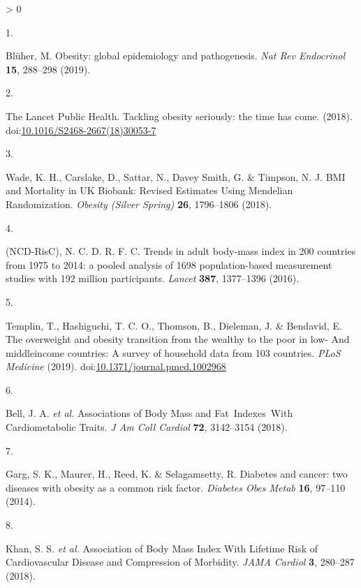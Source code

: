 \documentclass[11pt,twoside]{bristolthesis}
\newlength{\cslhangindent}
\newlength{\csllabelwidth}
\newenvironment{CSLReferences}[2] %
 {%
  \setlength{\parindent}{0pt}
  \ifodd #1 \everypar{\setlength{\hangindent}{\cslhangindent}}\ignorespaces\fi
  \ifnum #2 > 0
  \setlength{\parskip}{#2\baselineskip}
  \fi
 }%
 {}
\newcommand{\CSLLeftMargin}[1]{\parbox[t]{\csllabelwidth}{#1}}
\newcommand{\CSLRightInline}[1]{\parbox[t]{\linewidth - \csllabelwidth}{#1}\break}
\begin{document}
\hypertarget{refs}{}
\begin{CSLReferences}{0}{0}
\leavevmode\hypertarget{ref-Bluher2019}{}%
\CSLLeftMargin{1. }
\CSLRightInline{Blüher, M. {Obesity: global epidemiology and pathogenesis}. \emph{Nat Rev Endocrinol} \textbf{15}, 288--298 (2019).}

\leavevmode\hypertarget{ref-TheLancetPublicHealth2018}{}%
\CSLLeftMargin{2. }
\CSLRightInline{The Lancet Public Health. {Tackling obesity seriously: the time has come}. (2018). doi:\href{https://doi.org/10.1016/S2468-2667(18)30053-7}{10.1016/S2468-2667(18)30053-7}}

\leavevmode\hypertarget{ref-Wade2018}{}%
\CSLLeftMargin{3. }
\CSLRightInline{Wade, K. H., Carslake, D., Sattar, N., Davey Smith, G. \& Timpson, N. J. {BMI and Mortality in UK Biobank: Revised Estimates Using Mendelian Randomization}. \emph{Obesity (Silver Spring)} \textbf{26}, 1796--1806 (2018).}

\leavevmode\hypertarget{ref-NCD-RisC2016}{}%
\CSLLeftMargin{4. }
\CSLRightInline{(NCD-RisC), N. C. D. R. F. C. {Trends in adult body-mass index in 200 countries from 1975 to 2014: a pooled analysis of 1698 population-based measurement studies with 19{{}}2 million participants}. \emph{Lancet} \textbf{387}, 1377--1396 (2016).}

\leavevmode\hypertarget{ref-Templin2019}{}%
\CSLLeftMargin{5. }
\CSLRightInline{Templin, T., Hashiguchi, T. C. O., Thomson, B., Dieleman, J. \& Bendavid, E. {The overweight and obesity transition from the wealthy to the poor in low- And middleincome countries: A survey of household data from 103 countries}. \emph{PLoS Medicine} (2019). doi:\href{https://doi.org/10.1371/journal.pmed.1002968}{10.1371/journal.pmed.1002968}}

\leavevmode\hypertarget{ref-Bell2018}{}%
\CSLLeftMargin{6. }
\CSLRightInline{Bell, J. A. \emph{et al.} {Associations of Body Mass and Fat~Indexes~With Cardiometabolic Traits}. \emph{J Am Coll Cardiol} \textbf{72}, 3142--3154 (2018).}

\leavevmode\hypertarget{ref-Garg2014}{}%
\CSLLeftMargin{7. }
\CSLRightInline{Garg, S. K., Maurer, H., Reed, K. \& Selagamsetty, R. {Diabetes and cancer: two diseases with obesity as a common risk factor}. \emph{Diabetes Obes Metab} \textbf{16}, 97--110 (2014).}

\leavevmode\hypertarget{ref-Khan2018}{}%
\CSLLeftMargin{8. }
\CSLRightInline{Khan, S. S. \emph{et al.} {Association of Body Mass Index With Lifetime Risk of Cardiovascular Disease and Compression of Morbidity}. \emph{JAMA Cardiol} \textbf{3}, 280--287 (2018).}


\end{CSLReferences}
\end{document}
